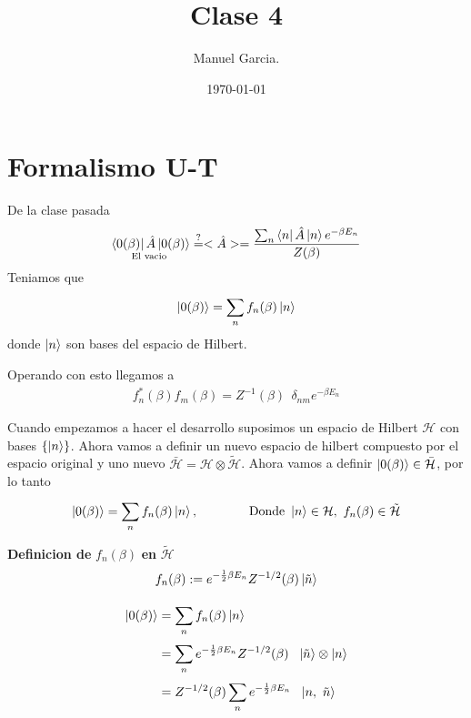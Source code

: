 \documentclass{article}
\title{Clase 4 }
\author{Manuel Garcia.}
\date{\today}
\begin{document}
\maketitle

\section{Formalismo U-T }
De la clase pasada
\begin{gather*}
  \underset{\text{El vacio }}{\bra{0(\beta)}\hat A \ket{0(\beta)} } \overset{?}{=}<\hat A > = \frac{\sum_{n }^{} \bra{n }\hat A \ket{n } e ^ {-\beta E_n }   }{Z (\beta )} 
\end{gather*}
Teniamos que
\begin{gather*}
  \ket{0(\beta)} = \displaystyle\sum_{n }^{} f_n(\beta) \ket{n } 
\end{gather*}
donde $ \ket{n } $ son bases del espacio de Hilbert.

\hfill 

Operando con esto llegamos a 
\begin{gather*}
  f_n^*(\beta) f_m(\beta)= Z ^ {-1 }(\beta)\ \ \delta _{nm} e ^ {-\beta E_n } 
\end{gather*}

Cuando empezamos a hacer el desarrollo suposimos un espacio de Hilbert $ \mathcal H  $ con bases $ \{\ket{n }\} $. Ahora vamos a definir un nuevo espacio de hilbert compuesto por el espacio original y uno nuevo $ \bar{\mathcal H } = \mathcal H \otimes \tilde{\mathcal H}$. Ahora vamos a definir $ \ket{0(\beta)} \in \bar{\mathcal H } $, por lo tanto 
\begin{gather*}
  \ket{0(\beta)} = \displaystyle\sum_{n }^{} f_n(\beta) \ket{n }, \qquad \qquad \text{Donde }\ket{n }\in \mathcal H, \ f_n(\beta) \in \tilde{\mathcal H }  
\end{gather*}

\textbf{Definicion de }$ f_n(\beta)  $ \textbf{en }$ \tilde{\mathcal H } $
\begin{gather*}
  f_n(\beta) := e ^ {-\frac{1}{2} \beta E_n}Z ^ {-1/2 }(\beta) \ket{\tilde n } 
\end{gather*}

\begin{align*}
  \ket{0(\beta)} &= \displaystyle\sum_{n }^{}f_n(\beta)\ket{n } \\
             &= \displaystyle\sum_{n }^{} e ^ {-\frac{1}{2} \beta E_n}Z ^ {-1/2 }(\beta)\ \ \ket{\tilde n } \otimes \ket{n }\\
             &= Z ^ {-1/2 }(\beta)\displaystyle\sum_{n }^{} e ^ {-\frac{1}{2} \beta E_n}\ \ \ket{n,\ \tilde n }
\end{align*}
\end{document}
